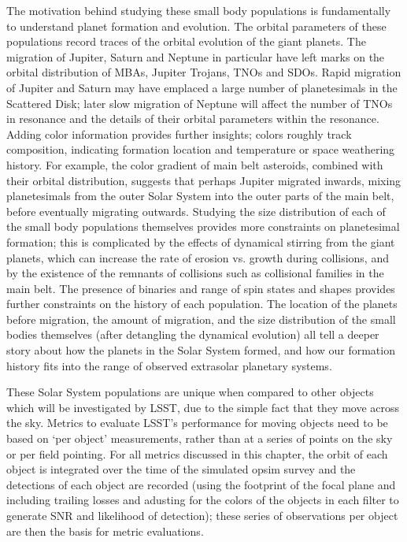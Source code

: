 The motivation behind studying these small body populations is
fundamentally to understand planet formation and evolution. The
orbital parameters of these populations record traces of the orbital
evolution of the giant planets. The migration of Jupiter, Saturn and
Neptune in particular have left marks on the orbital distribution of
MBAs, Jupiter Trojans, TNOs and SDOs. Rapid migration of
Jupiter and Saturn may have emplaced a large number of planetesimals
in the Scattered Disk; later slow migration of Neptune will affect the
number of TNOs in resonance and the details of their orbital parameters
within the resonance. Adding color information provides further
insights; colors roughly track composition, indicating formation
location and temperature or space weathering history. For example, the color
gradient of main belt asteroids, combined with their orbital
distribution, suggests that perhaps Jupiter migrated inwards,
mixing planetesimals from the outer Solar System into the outer parts
of the main belt, before eventually migrating outwards. Studying the
size distribution of each of the small body populations themselves
provides more constraints on planetesimal formation; this is
complicated by the effects of dynamical stirring from the giant
planets, which can increase the rate of erosion vs. growth during
collisions, and by the existence of the remnants of collisions such as
collisional families in the main belt. The presence of binaries and range
of spin states and shapes provides further constraints on the history
of each population. The location
of the planets before migration, the amount of migration, and the size
distribution of the small bodies themselves (after detangling the
dynamical evolution) all tell a deeper story about how the planets in
the Solar System formed, and how our formation history fits into the
range of observed extrasolar planetary systems.

These Solar System populations are unique when compared to other
objects which will be investigated by LSST, due to the simple fact
that they move across the sky. Metrics to evaluate
LSST's performance for moving objects need to be based on `per object'
measurements, rather than at a series of points on the sky or per
field pointing. For all metrics discussed in this chapter, the orbit
of each object is integrated over the time of the simulated opsim
survey and the detections of each object are recorded (using the
footprint of the focal plane and including
trailing losses and adusting for the colors of the objects in each
filter to generate SNR and likelihood of detection); these
series of observations per object are then the basis for metric
evaluations.


